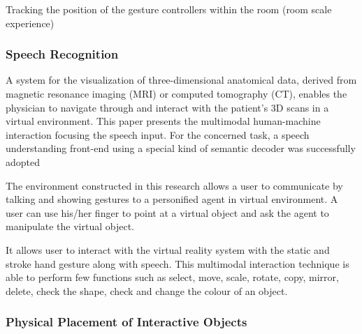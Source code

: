 Tracking the position of the gesture controllers within the room (room scale experience)
\cite{Htcvive2016}


\subsubsection{Speech Recognition}

A system for the visualization of three-dimensional anatomical data, derived from magnetic resonance imaging (MRI) or computed tomography (CT), enables the physician to navigate through and interact with the patient's 3D scans in a virtual environment. This paper presents the multimodal human-machine interaction focusing the speech input. For the concerned task, a speech understanding front-end using a special kind of semantic decoder was successfully adopted
\cite{Muller1998}

The environment constructed in this research allows a user to communicate by talking and showing gestures
to a personified agent in virtual environment. A user can use his/her finger to point at a virtual object and ask the agent to manipulate the virtual object.
\cite{Uchino2008}

It allows user to interact with the virtual reality system with the static and stroke hand gesture along with speech. This multimodal interaction technique is able to perform few functions such as select, move, scale, rotate, copy, mirror, delete, check the shape, check and change the colour of an object.
\cite{Chun2015}


\subsubsection{Physical Placement of Interactive Objects}

